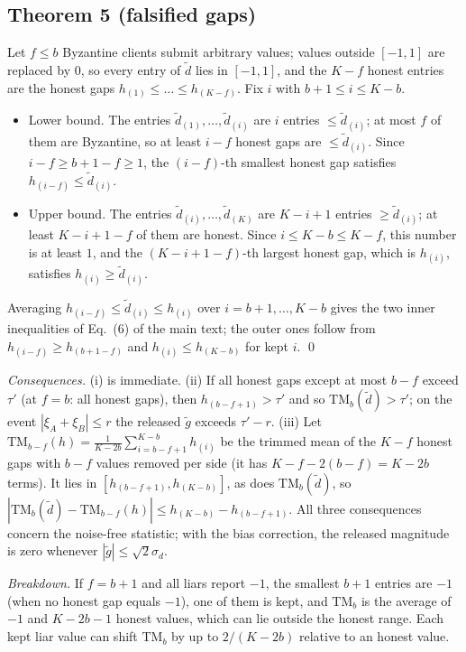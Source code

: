 \documentclass[11pt]{article}
\theoremstyle{plain}
\theoremstyle{definition}
\newcommand{\TM}{\mathrm{TM}_b}
\newcommand{\gt}{\tilde g}
\begin{document}
\subsection*{Theorem 5 (falsified gaps)}
Let $f\le b$ Byzantine clients submit arbitrary values; values outside $[-1,1]$ are replaced by $0$, so every entry of $\tilde d$ lies in $[-1,1]$, and the $K-f$ honest entries are the honest gaps $h_{(1)}\le\dots\le h_{(K-f)}$.
Fix $i$ with $b+1\le i\le K-b$.
\begin{itemize}
\item Lower bound. The entries $\tilde d_{(1)},\dots,\tilde d_{(i)}$ are $i$ entries $\le\tilde d_{(i)}$; at most $f$ of them are Byzantine, so at least $i-f$ honest gaps are $\le\tilde d_{(i)}$. Since $i-f\ge b+1-f\ge1$, the $(i-f)$-th smallest honest gap satisfies $h_{(i-f)}\le\tilde d_{(i)}$.
\item Upper bound. The entries $\tilde d_{(i)},\dots,\tilde d_{(K)}$ are $K-i+1$ entries $\ge\tilde d_{(i)}$; at least $K-i+1-f$ of them are honest. Since $i\le K-b\le K-f$, this number is at least $1$, and the $(K-i+1-f)$-th largest honest gap, which is $h_{(i)}$, satisfies $h_{(i)}\ge\tilde d_{(i)}$.
\end{itemize}
Averaging $h_{(i-f)}\le\tilde d_{(i)}\le h_{(i)}$ over $i=b+1,\dots,K-b$ gives the two inner inequalities of Eq.~(6) of the main text; the outer ones follow from $h_{(i-f)}\ge h_{(b+1-f)}$ and $h_{(i)}\le h_{(K-b)}$ for kept $i$. \qed

\emph{Consequences.} (i) is immediate. (ii) If all honest gaps except at most $b-f$ exceed $\tau'$ (at $f=b$: all honest gaps), then $h_{(b-f+1)}>\tau'$ and so $\TM(\tilde d)>\tau'$; on the event $|\xi_A+\xi_B|\le r$ the released $\gt$ exceeds $\tau'-r$. (iii) Let $\mathrm{TM}_{b-f}(h)=\frac{1}{K-2b}\sum_{i=b-f+1}^{K-b}h_{(i)}$ be the trimmed mean of the $K-f$ honest gaps with $b-f$ values removed per side (it has $K-f-2(b-f)=K-2b$ terms). It lies in $[h_{(b-f+1)},h_{(K-b)}]$, as does $\TM(\tilde d)$, so $|\TM(\tilde d)-\mathrm{TM}_{b-f}(h)|\le h_{(K-b)}-h_{(b-f+1)}$. All three consequences concern the noise-free statistic; with the bias correction, the released magnitude is zero whenever $|\gt|\le\sqrt2\sigma_d$.

\emph{Breakdown.} If $f=b+1$ and all liars report $-1$, the smallest $b+1$ entries are $-1$ (when no honest gap equals $-1$), one of them is kept, and $\TM$ is the average of $-1$ and $K-2b-1$ honest values, which can lie outside the honest range. Each kept liar value can shift $\TM$ by up to $2/(K-2b)$ relative to an honest value.
\end{document}

